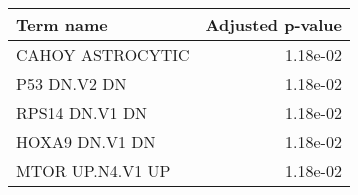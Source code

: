 \begin{tabular}{lr}
\toprule
       Term name &  Adjusted p-value \\
\midrule
CAHOY ASTROCYTIC &          1.18e-02 \\
    P53 DN.V2 DN &          1.18e-02 \\
  RPS14 DN.V1 DN &          1.18e-02 \\
  HOXA9 DN.V1 DN &          1.18e-02 \\
MTOR UP.N4.V1 UP &          1.18e-02 \\
\bottomrule
\end{tabular}
